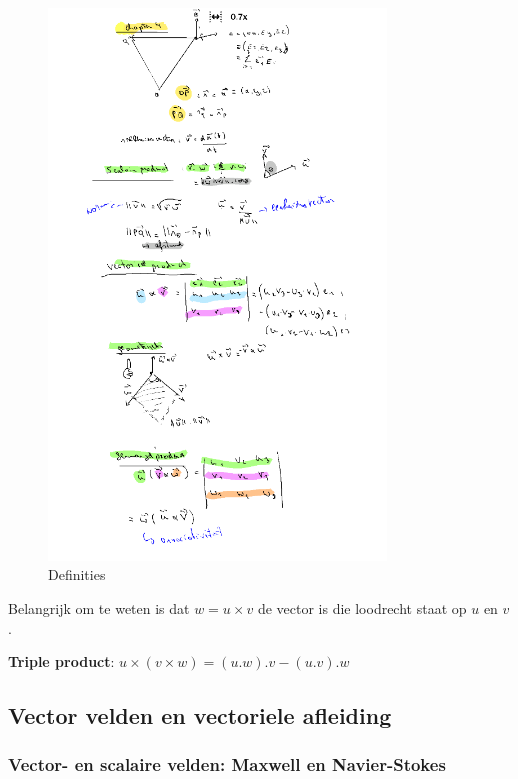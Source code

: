 \documentclass[a4paper]{article}
\begin{document}
\begin{figure}[H]
	\centering
	\includegraphics[width=0.8\textwidth]{assets/termen_h4.png}
	\caption{Definities}
	\label{fig:termen_h4}
\end{figure}

Belangrijk om te weten is dat $w = u \times v$ de vector is die loodrecht staat op $u$ en $v$.

\textbf{Triple product}: $u \times (v \times w) =  (u . w) . v - (u . v) . w$

\subsection{Vector velden en vectoriele afleiding}

\subsubsection{Vector- en scalaire velden: Maxwell en Navier-Stokes}
\end{document}
